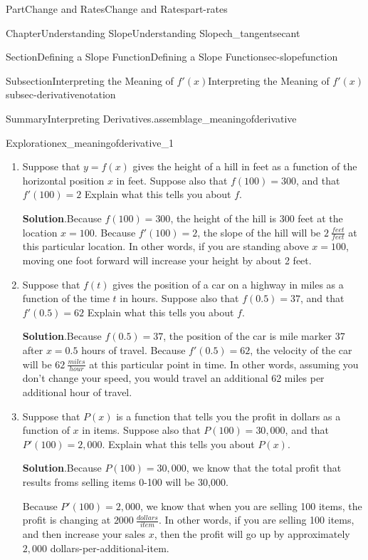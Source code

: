 \documentclass{tufte-book}
\newcommand{\blocktitlefont}{\relax}
\numberwithin{equation}{chapter}
\begin{document}
\begin{partptx}{Part}{Change and Rates}{}{Change and Rates}{}{}{part-rates}
\begin{chapterptx}{Chapter}{Understanding Slope}{}{Understanding Slope}{}{}{ch_tangentsecant}
\begin{sectionptx}{Section}{Defining a Slope Function}{}{Defining a Slope Function}{}{}{sec-slopefunction}
\begin{subsectionptx}{Subsection}{Interpreting the Meaning of \(f'(x)\)}{}{Interpreting the Meaning of \(f'(x)\)}{}{}{subsec-derivativenotation}
\begin{assemblage}{Summary}{Interpreting Derivatives.}{assemblage_meaningofderivative}
\begin{descriptionlist}
\end{descriptionlist}
%
\end{assemblage}
\begin{exploration}{Exploration}{}{ex_meaningofderivative_1}%
\begin{enumerate}[font=\bfseries,label=(\alph*),ref=\alph*]%
\item{}Suppose that \(y=f(x)\) gives the height of a hill in feet as a function of the horizontal position \(x\) in feet. Suppose also that \(f(100) = 300\), and that \(f'(100)=2\) Explain what this tells you about \(f\).%
\par\smallskip%
\noindent\textbf{\blocktitlefont Solution}.\hypertarget{ex_meaningofderivative_1-1-2}{}\quad{}Because \(f(100)=300\), the height of the hill is 300 feet at the location \(x=100\). Because \(f'(100)=2\), the slope of the hill will be \(2 \ \frac{feet}{feet}\) at this particular location. In other words, if you are standing above \(x=100\), moving one foot forward will increase your height by about 2 feet.%
\item{}Suppose that \(f(t)\) gives the position of a car on a highway in miles as a function of the time \(t\) in hours. Suppose also that \(f(0.5) = 37\), and that \(f'(0.5)=62\) Explain what this tells you about \(f\).%
\par\smallskip%
\noindent\textbf{\blocktitlefont Solution}.\hypertarget{ex_meaningofderivative_1-2-2}{}\quad{}Because \(f(0.5)=37\), the position of the car is mile marker 37 after \(x=0.5\) hours of travel. Because \(f'(0.5)=62\), the velocity of the car will be \(62 \ \frac{miles}{hour}\) at this particular point in time. In other words, assuming you don't change your speed, you would travel an additional 62 miles per additional hour of travel.%
\item{}Suppose that \(P(x)\) is a function that tells you the profit in dollars as a function of \(x\) in items. Suppose also  that \(P(100)=30,000\), and that \(P'(100)=2,000\). Explain what this tells you about \(P(x)\).%
\par\smallskip%
\noindent\textbf{\blocktitlefont Solution}.\hypertarget{ex_meaningofderivative_1-3-2}{}\quad{}Because \(P(100)=30,000\), we know that the total profit that results froms selling items 0-100 will be \textdollar{}30,000.%
\par
Because \(P'(100)=2,000\), we know that when you are selling 100 items, the profit is changing at \(2000\ \frac{dollars}{item}\). In other words, if you are selling 100 items, and then increase your sales \(x\), then the profit will go up by approximately \(2,000\) dollars-per-additional-item.%

\end{enumerate}
\end{exploration}
\end{subsectionptx}
\end{sectionptx}
\end{chapterptx}
\end{partptx}
\end{document}
